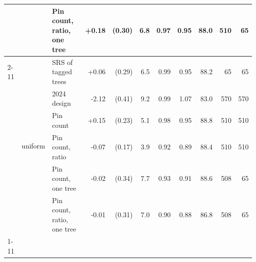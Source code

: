 \begin{tabular}{lll|rr|r|rr|r|rr}
 &  & Pin count, ratio, one tree & +0.18 & (0.30) & 6.8 & 0.97 & 0.95 & 88.0 & 510 & 65 \\
\cline{2-11}
 & \multirow[t]{6}{*}{uniform} & SRS of tagged trees & +0.06 & (0.29) & 6.5 & 0.99 & 0.95 & 88.2 & 65 & 65 \\
 &  & 2024 design & -2.12 & (0.41) & 9.2 & 0.99 & 1.07 & 83.0 & 570 & 570 \\
 &  & Pin count & +0.15 & (0.23) & 5.1 & 0.98 & 0.95 & 88.8 & 510 & 510 \\
 &  & Pin count, ratio & -0.07 & (0.17) & 3.9 & 0.92 & 0.89 & 88.4 & 510 & 510 \\
 &  & Pin count, one tree & -0.02 & (0.34) & 7.7 & 0.93 & 0.91 & 88.6 & 508 & 65 \\
 &  & Pin count, ratio, one tree & -0.01 & (0.31) & 7.0 & 0.90 & 0.88 & 86.8 & 508 & 65 \\
\cline{1-11} \cline{2-11}
\bottomrule
\end{tabular}
